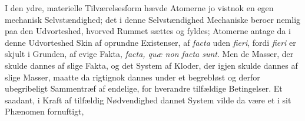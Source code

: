 \documentclass[12pt,a4paper]{book}
\begin{document}
I den ydre, materielle Tilværelsesform hævde Atomerne jo vistnok en
egen mechanisk Selvstændighed; det i denne Selvstændighed Mechaniske
beroer nemlig paa den Udvorteshed, hvorved Rummet sættes og fyldes;
Atomerne antage da i denne Udvorteshed Skin af
oprundne Existenser, af \textit{facta} uden \textit{fieri}, fordi
\textit{fieri} er skjult i Grunden, af evige Fakta, \textit{facta, quæ
non facta sunt}. Men de Masser, der skulde dannes af slige Fakta, og det
System af Kloder, der igjen skulde dannes af slige Masser, maatte da
rigtignok dannes under et begrebløst og derfor ubegribeligt Sammentræf
af endelige, for hverandre tilfældige Betingelser. Et saadant, i Kraft
af tilfældig Nødvendighed dannet System vilde da være et i sit
Phænomen fornuftigt,
\end{document}
